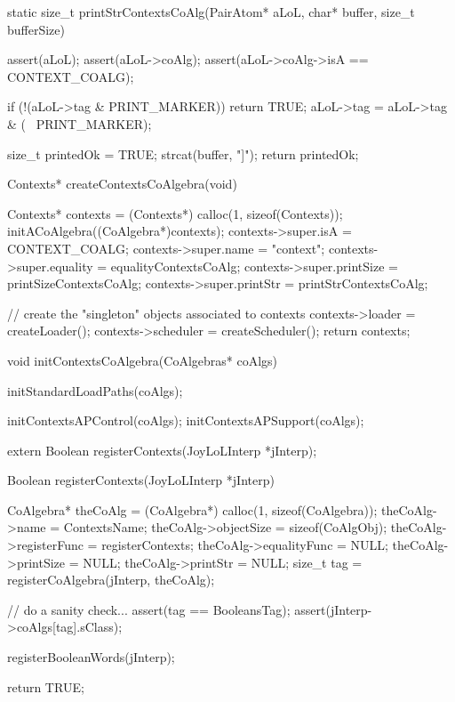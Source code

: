 static size_t printStrContextsCoAlg(PairAtom* aLoL,
                                   char* buffer, size_t bufferSize) {
  assert(aLoL);
  assert(aLoL->coAlg);
  assert(aLoL->coAlg->isA == CONTEXT_COALG);

  if (!(aLoL->tag & PRINT_MARKER)) return TRUE;
  aLoL->tag = aLoL->tag & (~ PRINT_MARKER);

  size_t printedOk = TRUE;
  strcat(buffer, "\n[");
  strcat(buffer, aLoL->context->name);
  strcat(buffer, "[ ");
  lolPrintStr(printedOk, aLoL->context->data,
              "d:( ", ") ", buffer, bufferSize);
  lolPrintStr(printedOk, aLoL->context->command,
              "c:( ", ") ", buffer, bufferSize);
  lolPrintStr(printedOk, aLoL->context->process,
              "p:( ", ") ", buffer, bufferSize);
  lolPrintStr(printedOk, aLoL->context->messages,
              "m:( ", ") ", buffer, bufferSize);
  lolPrintStr(printedOk, aLoL->context->listeners,
              "l:( ", ") ", buffer, bufferSize);
  strcat(buffer, " ]]\n");
  return printedOk;
}

Contexts* createContextsCoAlgebra(void) {
  Contexts* contexts  = (Contexts*) calloc(1, sizeof(Contexts));
  initACoAlgebra((CoAlgebra*)contexts);
  contexts->super.isA       = CONTEXT_COALG;
  contexts->super.name      = "context";
  contexts->super.equality  = equalityContextsCoAlg;
  contexts->super.printSize = printSizeContextsCoAlg;
  contexts->super.printStr  = printStrContextsCoAlg;

  // create the "singleton" objects associated to contexts
  contexts->loader          = createLoader();
  contexts->scheduler       = createScheduler();
  return contexts;
}

void initContextsCoAlgebra(CoAlgebras* coAlgs) {
  initStandardLoadPaths(coAlgs);

  initContextsAPControl(coAlgs);
  initContextsAPSupport(coAlgs);
}
\stoptyping

\startTestSuite[registerContexts]

\startCHeader
extern Boolean registerContexts(JoyLoLInterp *jInterp);
\stopCHeader
{}

\startCCode
Boolean registerContexts(JoyLoLInterp *jInterp) {
  CoAlgebra* theCoAlg    = (CoAlgebra*) calloc(1, sizeof(CoAlgebra));
  theCoAlg->name         = ContextsName;
  theCoAlg->objectSize   = sizeof(CoAlgObj);
  theCoAlg->registerFunc = registerContexts;
  theCoAlg->equalityFunc = NULL;
  theCoAlg->printSize    = NULL;
  theCoAlg->printStr     = NULL;
  size_t tag = registerCoAlgebra(jInterp, theCoAlg);

  // do a sanity check...
  assert(tag == BooleansTag);
  assert(jInterp->coAlgs[tag].sClass);
  
  registerBooleanWords(jInterp);
  
  return TRUE;
}
\stopCCode


